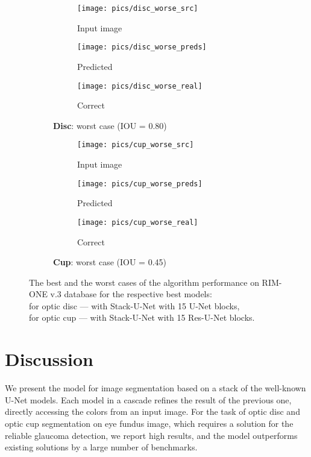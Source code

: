 \documentclass{llncs}
\begin{document}
\begin{figure}[h!]
	\begin{subfigure}[t]{0.5\textwidth}
		\begin{subfigure}[t]{0.3\textwidth}
			\texttt{[image: pics/disc\_worse\_src]} 
			\caption*{Input image}
		\end{subfigure}
		\begin{subfigure}[t]{0.3\textwidth}
			\texttt{[image: pics/disc\_worse\_preds]} 
			\caption*{Predicted}
		\end{subfigure}
		\begin{subfigure}[t]{0.3\textwidth}
			\texttt{[image: pics/disc\_worse\_real]} 
			\caption*{Correct}
		\end{subfigure}
		\caption*{\textbf{Disc}: worst case (IOU = 0.80)}
	\end{subfigure}
	\hspace{0.15cm}
	\begin{subfigure}[t]{0.5\textwidth}
		\begin{subfigure}[t]{0.3\textwidth}
			\texttt{[image: pics/cup\_worse\_src]} 
			\caption*{Input image}
		\end{subfigure}
		\begin{subfigure}[t]{0.3\textwidth}
			\texttt{[image: pics/cup\_worse\_preds]} 
			\caption*{Predicted}
		\end{subfigure}
		\begin{subfigure}[t]{0.3\textwidth}
			\texttt{[image: pics/cup\_worse\_real]} 
			\caption*{Correct}
		\end{subfigure}
		\caption*{\textbf{Cup}: worst case (IOU = 0.45)}
	\end{subfigure}
	
	\caption{The best and the worst cases of the algorithm performance on RIM-ONE v.3 database for the respective best models: \\ for optic disc --- with Stack-U-Net with 15 U-Net blocks, \\ for optic cup --- with Stack-U-Net with 15 Res-U-Net blocks.}
	\label{fig:visual_results}
\end{figure}


\section{Discussion}


We present the model for image segmentation based on a stack of the well-known U-Net models. Each model in a cascade refines the result of the previous one, directly accessing the colors from an input image. For the task of optic disc and optic cup segmentation on eye fundus image, which requires a solution for the reliable glaucoma detection, we report high results, and the model outperforms existing solutions by a large number of benchmarks.
\end{document}
